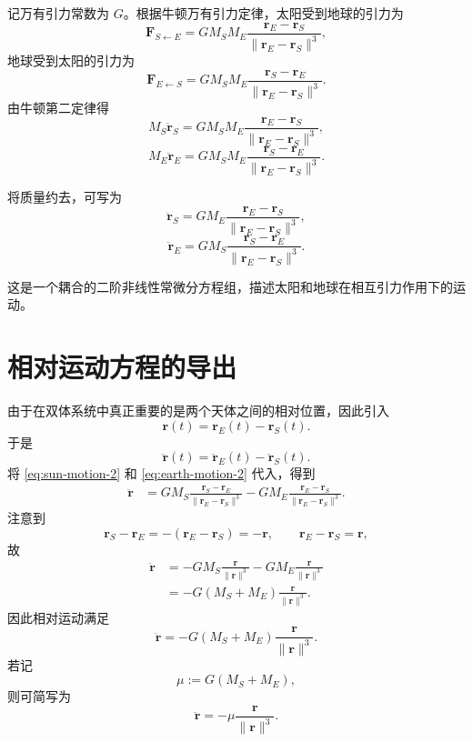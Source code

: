 \documentclass[12pt,a4paper]{ctexrep}
\begin{document}
记万有引力常数为 \(G\)。根据牛顿万有引力定律，太阳受到地球的引力为
\[
\bm F_{S\leftarrow E}
=
G M_S M_E
\frac{\bm r_E-\bm r_S}{\|\bm r_E-\bm r_S\|^3},
\]
地球受到太阳的引力为
\[
\bm F_{E\leftarrow S}
=
G M_S M_E
\frac{\bm r_S-\bm r_E}{\|\bm r_E-\bm r_S\|^3}.
\]
由牛顿第二定律得
\begin{equation}\label{eq:sun-motion}
M_S \ddot{\bm r}_S
=
G M_S M_E
\frac{\bm r_E-\bm r_S}{\|\bm r_E-\bm r_S\|^3},
\end{equation}
\begin{equation}\label{eq:earth-motion}
M_E \ddot{\bm r}_E
=
G M_S M_E
\frac{\bm r_S-\bm r_E}{\|\bm r_E-\bm r_S\|^3}.
\end{equation}

将质量约去，可写为
\begin{equation}\label{eq:sun-motion-2}
\ddot{\bm r}_S
=
G M_E
\frac{\bm r_E-\bm r_S}{\|\bm r_E-\bm r_S\|^3},
\end{equation}
\begin{equation}\label{eq:earth-motion-2}
\ddot{\bm r}_E
=
G M_S
\frac{\bm r_S-\bm r_E}{\|\bm r_E-\bm r_S\|^3}.
\end{equation}

这是一个耦合的二阶非线性常微分方程组，描述太阳和地球在相互引力作用下的运动。

\section{相对运动方程的导出}

由于在双体系统中真正重要的是两个天体之间的相对位置，因此引入
\[
\bm r(t)=\bm r_E(t)-\bm r_S(t).
\]
于是
\[
\ddot{\bm r}(t)=\ddot{\bm r}_E(t)-\ddot{\bm r}_S(t).
\]
将 \eqref{eq:sun-motion-2} 和 \eqref{eq:earth-motion-2} 代入，得到
\begin{align*}
\ddot{\bm r}
&=
G M_S \frac{\bm r_S-\bm r_E}{\|\bm r_E-\bm r_S\|^3}
-
G M_E \frac{\bm r_E-\bm r_S}{\|\bm r_E-\bm r_S\|^3}.
\end{align*}
注意到
\[
\bm r_S-\bm r_E=-(\bm r_E-\bm r_S)=-\bm r,
\qquad
\bm r_E-\bm r_S=\bm r,
\]
故
\begin{align*}
\ddot{\bm r}
&=
- G M_S \frac{\bm r}{\|\bm r\|^3}
- G M_E \frac{\bm r}{\|\bm r\|^3} \\
&=
- G(M_S+M_E)\frac{\bm r}{\|\bm r\|^3}.
\end{align*}
因此相对运动满足
\begin{equation}\label{eq:relative-motion}
\ddot{\bm r}
=
- G(M_S+M_E)\frac{\bm r}{\|\bm r\|^3}.
\end{equation}
若记
\[
\mu:=G(M_S+M_E),
\]
则可简写为
\begin{equation}\label{eq:relative-motion-mu}
\ddot{\bm r}=-\mu \frac{\bm r}{\|\bm r\|^3}.
\end{equation}
\end{document}
